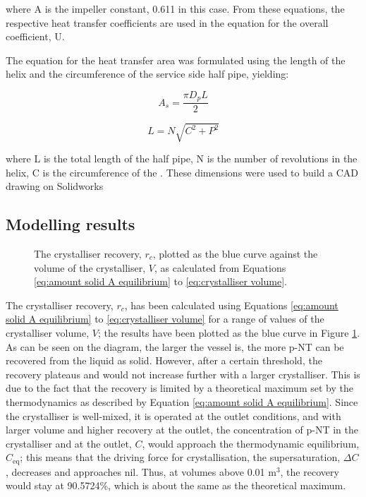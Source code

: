 where A is the impeller constant, 0.611 in this case. From these equations, the respective heat transfer coefficients are used in the equation for the overall coefficient, U.



The equation for the heat transfer area was formulated using the length of the helix and the circumference of the service side half pipe, yielding:

\begin{equation} \label{eq:coolantpipesa}
    A_s = \frac{\pi D_p L}{2}
    \end{equation}
    
\begin{equation}\label{eq:helixlength}
    L = N \sqrt{C^2 + P^2}
\end{equation}

where L is the total length of the half pipe, N is the number of revolutions in the helix, C is the circumference of the . These dimensions were used to build a CAD drawing on Solidworks




\subsection{Modelling results}\label{sec:modelling results crystalliser}

\begin{figure}[h]
    \centering
    
    \caption{The crystalliser recovery, $r_c$, plotted as the blue curve against the volume of the crystalliser, $V$, as calculated from Equations \ref{eq:amount solid A equilibrium} to \ref{eq:crystalliser volume}. }
    \label{fig:recovery vs volume crystalliser}
\end{figure}

\noindent The crystalliser recovery, $r_c$, has been calculated using Equations \ref{eq:amount solid A equilibrium} to \ref{eq:crystalliser volume} for a range of values of the crystalliser volume, $V$; the results have been plotted as the blue curve in Figure \ref{fig:recovery vs volume crystalliser}. As can be seen on the diagram, the larger the vessel is, the more p-NT can be recovered from the liquid as solid. However, after a certain threshold, the recovery plateaus and would not increase further with a larger crystalliser. This is due to the fact that the recovery is limited by a theoretical maximum set by the thermodynamics as described by Equation \ref{eq:amount solid A equilibrium}. Since the crystalliser is well-mixed, it is operated at the outlet conditions, and with larger volume and higher recovery at the outlet, the concentration of p-NT in the crystalliser and at the outlet, $C$, would approach the thermodynamic equilibrium, $C_{\mathrm{eq}}$; this means that the driving force for crystallisation, the supersaturation, $\Delta C$, decreases and approaches nil. Thus, at volumes above 0.01 m$^{3}$, the recovery would stay at 90.5724\%, which is about the same as the theoretical maximum. 


